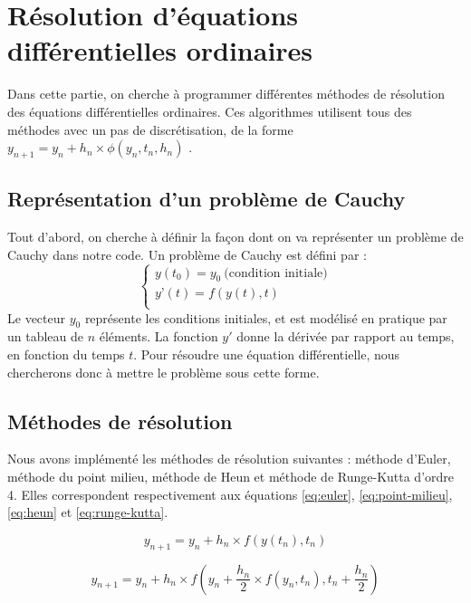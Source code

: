 \section{Résolution d'équations différentielles ordinaires}

Dans cette partie, on cherche à programmer différentes méthodes de résolution
des équations différentielles ordinaires.
Ces algorithmes utilisent tous des méthodes avec un pas de discrétisation, de la forme
$y_{n+1}=y_n+h_n \times \phi (y_n,t_n,h_n)$ .

\subsection{Représentation d'un problème de Cauchy}
Tout d'abord, on cherche à définir la façon dont on va représenter
un problème de Cauchy dans notre code. Un problème de Cauchy est défini par :
\begin{equation}
	\begin{cases}
		y(t_0)=y_0 ~\text{(condition initiale)}\\
		y’(t)=f(y(t),t) \\
	\end{cases}    
\end{equation}
Le vecteur $y_0$ représente les conditions initiales, et est modélisé en pratique par un tableau de $n$ éléments.
La fonction $y'$ donne la dérivée par rapport au temps, en fonction du temps $t$.
Pour résoudre une équation différentielle, nous chercherons donc à mettre le problème sous cette forme.

\subsection{Méthodes de résolution}
Nous avons implémenté les méthodes de résolution suivantes : méthode d’Euler, méthode du point milieu,
méthode de Heun et méthode de Runge-Kutta d’ordre 4. Elles correspondent respectivement aux équations
\ref{eq:euler}, \ref{eq:point-milieu}, \ref{eq:heun} et \ref{eq:runge-kutta}.

\begin{equation}
	y_{n+1} = y_n + h_n \times f(y(t_n), t_n)
	\label{eq:euler}
\end{equation}

\begin{equation}
	y_{n+1} = y_n + h_n \times f \left(y_n + \frac{h_n}{2} \times f(y_n, t_n), t_n + \frac{h_n}{2}\right)
	\label{eq:point-milieu}
\end{equation}

